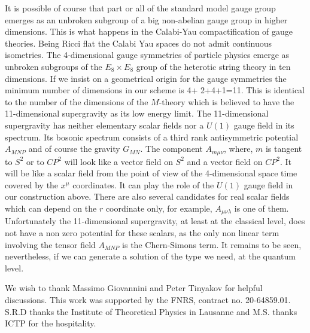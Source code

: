 \documentclass[a4paper,12pt]{article}
\begin{document}
It is possible of course that part or all of the standard model gauge
group emerges as an unbroken subgroup of a big non-abelian gauge
group in higher dimensions. This is what happens in the Calabi-Yau
compactification of gauge theories. Being Ricci flat the Calabi Yau
spaces do not admit continuous isometries. The 4-dimensional gauge
symmetries of particle physics emerge as unbroken subgroups of the
$E_8\times E_8$ group of the heterotic string theory in ten
dimensions. If we insist on a geometrical origin for the gauge
symmetries the minimum number of dimensions in our scheme is 4+
2+4+1=11. This is identical to the number of the dimensions of the
$M$-theory which is believed to have the 11-dimensional supergravity
as its low energy limit. The 11-dimensional supergravity has
neither elementary scalar fields  nor a $U(1)$ gauge field in its
spectrum. Its bosonic spectrum consists of a third rank antisymmetric
potential $A_{MNP}$ and of course the gravity $G_{MN}$. The component
$A_{m\mu\nu}$, where, $m$ is tangent to $S^2$ or to $CP^2$ will look
like a vector field on $S^2$ and a vector field on $CP^2$. It will be
like a scalar field from the point of view of the 4-dimensional space
time covered by the $x^\mu$ coordinates. It can play the role of the
$U(1)$ gauge field in our construction above.  There are also several
candidates for real scalar fields which can depend on the $r$
coordinate only, for example, $A_{\mu\nu\lambda}$ is one of them.
Unfortunately the 11-dimensional supergravity, at least at the
classical level,  does not have  a non zero potential for these
scalars, as the only non linear term involving the tensor field
$A_{MNP}$ is the Chern-Simons term.  It remains to be seen,
nevertheless, if we can generate a solution of the type we need, at
the quantum level.


We wish to thank Massimo Giovannini and Peter Tinyakov for helpful
discussions. This work was supported by the FNRS, contract no.
20-64859.01. S.R.D thanks the Institute of Theoretical
Physics in Lausanne and M.S. thanks ICTP for the hospitality.
\end{document}
